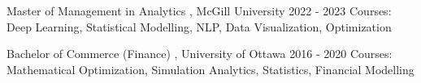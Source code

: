 \experienceheader
    {Master of Management in Analytics}
    {\small , McGill University}
    {2022 - 2023}
    {Courses: Deep Learning, Statistical Modelling, NLP, Data Visualization, Optimization}
    
\vspace{7pt}

\experienceheader
    {Bachelor of Commerce (Finance)}
    {\small , University of Ottawa}
    {2016 - 2020}
    {Courses: Mathematical Optimization, Simulation Analytics, Statistics, Financial Modelling}
